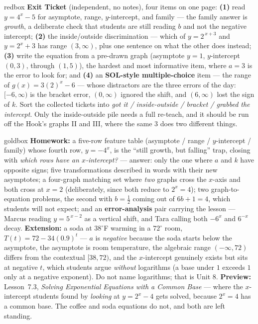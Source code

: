 \documentclass[10pt]{article}
\begin{document}
\begin{skillbox}{redbox}
\textbf{Exit Ticket} (independent, no notes), four items on one page: \textbf{(1)} read $y=4^{x}-5$
for asymptote, range, $y$-intercept, and family --- the family answer is \emph{growth}, a deliberate
check that students are still reading $b$ and not the negative intercept; \textbf{(2)} the
inside/outside discrimination --- which of $y=2^{\,x+3}$ and $y=2^{x}+3$ has range $(3,\infty)$, plus
one sentence on what the other does instead; \textbf{(3)} write the equation from a pre-drawn graph
(asymptote $y=1$, $y$-intercept $(0,3)$, through $(1,5)$), the hardest and most informative item, where
$a=3$ is the error to look for; and \textbf{(4)} an \textbf{SOL-style multiple-choice} item --- the
range of $g(x)=3(2)^{x}-6$ --- whose distractors are the three errors of the day: $[-6,\infty)$ is the
bracket error, $(0,\infty)$ ignored the shift, and $(6,\infty)$ lost the sign of $k$. Sort the collected
tickets into \emph{got it / inside-outside / bracket / grabbed the intercept}. Only the inside-outside
pile needs a full re-teach, and it should be run off the Hook's graphs II and III, where the same $3$
does two different things.
\end{skillbox}

\begin{skillbox}{goldbox}
\textbf{Homework:} a five-row feature table (asymptote / range / $y$-intercept / family) whose fourth
row, $y=-4^{x}$, is the ``still growth, but falling'' trap, closing with \emph{which rows have an
$x$-intercept?} --- answer: only the one where $a$ and $k$ have opposite signs; five transformations
described in words with their new asymptotes; a four-graph matching set where \emph{two} graphs cross
the $x$-axis and both cross at $x=2$ (deliberately, since both reduce to $2^{x}=4$); two graph-to-equation
problems, the second with $b=\frac12$ coming out of $6b+1=4$, which students will not expect; and an
\textbf{error-analysis} pair carrying the lesson --- Marcus reading $y=5^{\,x-2}$ as a vertical shift,
and Tara calling both $-6^{x}$ and $6^{-x}$ decay. \textbf{Extension:} a soda at $38^{\circ}$F warming
in a $72^{\circ}$ room, $T(t)=72-34(0.9)^{t}$ --- $a$ is \emph{negative} because the soda starts below
the asymptote, the asymptote is room temperature, the algebraic range $(-\infty,72)$ differs from the
contextual $[38,72)$, and the $x$-intercept genuinely exists but sits at negative $t$, which students
argue \emph{without} logarithms (a base under $1$ exceeds $1$ only at a negative exponent). Do not name
logarithms; that is Unit 8. \textbf{Preview:} Lesson~7.3, \emph{Solving Exponential Equations with a
Common Base} --- where the $x$-intercept students found by \emph{looking} at $y=2^{x}-4$ gets solved,
because $2^{x}=4$ has a common base. The coffee and soda equations do not, and both are left standing.
\end{skillbox}
\end{document}
